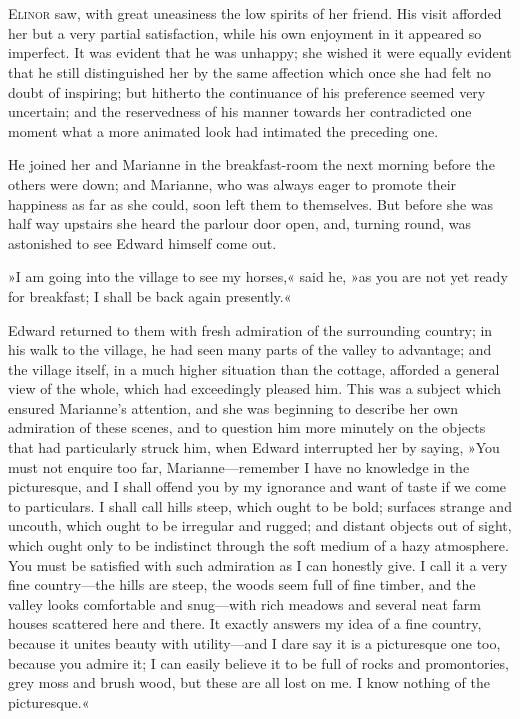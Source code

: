 \chapter[Chapter \thechapter]{}
\lettrine[lines=4,lraise=0.3]{E}{linor} saw, with great uneasiness the low spirits of her friend. His visit afforded her but a very partial satisfaction, while his own enjoyment in it appeared so imperfect. It was evident that he was unhappy; she wished it were equally evident that he still distinguished her by the same affection which once she had felt no doubt of inspiring; but hitherto the continuance of his preference seemed very uncertain; and the reservedness of his manner towards her contradicted one moment what a more animated look had intimated the preceding one.

He joined her and Marianne in the breakfast-room the next morning before the others were down; and Marianne, who was always eager to promote their happiness as far as she could, soon left them to themselves. But before she was half way upstairs she heard the parlour door open, and, turning round, was astonished to see Edward himself come out.

»I am going into the village to see my horses,« said he, »as you are not yet ready for breakfast; I shall be back again presently.«

Edward returned to them with fresh admiration of the surrounding country; in his walk to the village, he had seen many parts of the valley to advantage; and the village itself, in a much higher situation than the cottage, afforded a general view of the whole, which had exceedingly pleased him. This was a subject which ensured Marianne’s attention, and she was beginning to describe her own admiration of these scenes, and to question him more minutely on the objects that had particularly struck him, when Edward interrupted her by saying, »You must not enquire too far, Marianne—remember I have no knowledge in the picturesque, and I shall offend you by my ignorance and want of taste if we come to particulars. I shall call hills steep, which ought to be bold; surfaces strange and uncouth, which ought to be irregular and rugged; and distant objects out of sight, which ought only to be indistinct through the soft medium of a hazy atmosphere. You must be satisfied with such admiration as I can honestly give. I call it a very fine country—the hills are steep, the woods seem full of fine timber, and the valley looks comfortable and snug—with rich meadows and several neat farm houses scattered here and there. It exactly answers my idea of a fine country, because it unites beauty with utility—and I dare say it is a picturesque one too, because you admire it; I can easily believe it to be full of rocks and promontories, grey moss and brush wood, but these are all lost on me. I know nothing of the picturesque.«

